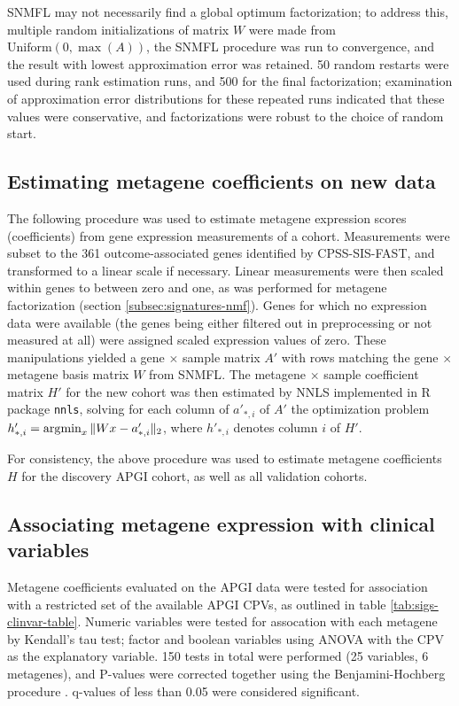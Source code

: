 \documentclass[dissertation.tex]{subfiles}
\begin{document}
\gls{SNMFL} may not necessarily find a global optimum factorization; to address this, multiple random initializations of matrix $W$ were made from $\text{Uniform}(0, \max(A))$, the \gls{SNMFL} procedure was run to convergence, and the result with lowest approximation error was retained.  50 random restarts were used during rank estimation runs, and 500 for the final factorization; examination of approximation error distributions for these repeated runs indicated that these values were conservative, and factorizations were robust to the choice of random start.

\subsection{Estimating metagene coefficients on new data}
\label{subsec:sigs-metagene-est}
The following procedure was used to estimate metagene expression scores (coefficients) from gene expression measurements of a cohort.  Measurements were subset to the 361 outcome-associated genes identified by \gls{CPSS}-\gls{SIS}-\gls{FAST}, and transformed to a linear scale if necessary.  Linear measurements were then scaled within genes to between zero and one, as was performed for metagene factorization (section \ref{subsec:signatures-nmf}).  Genes for which no expression data were available (the genes being either filtered out in preprocessing or not measured at all) were assigned scaled expression values of zero.  These manipulations yielded a gene $\times$ sample matrix $A'$ with rows matching the gene $\times$ metagene basis matrix $W$ from \gls{SNMFL}.  The metagene $\times$ sample coefficient matrix $H'$ for the new cohort was then estimated by \gls{NNLS} implemented in R package \texttt{nnls}, solving for each column of $a'_{*,i}$ of $A'$ the optimization problem ${h'_{*,i}} = \operatorname*{\arg\!\min}_x \| W x - a'_{*,i} \|_2$, where $h'_{*,i}$ denotes column $i$ of $H'$.

For consistency, the above procedure was used to estimate metagene coefficients $H$ for the discovery \gls{APGI} cohort, as well as all validation cohorts.

\subsection{Associating metagene expression with clinical variables}
Metagene coefficients evaluated on the \gls{APGI} data were tested for association with a restricted set of the available \gls{APGI} \glspl{CPV}, as outlined in table \ref{tab:sigs-clinvar-table}.  Numeric variables were tested for assocation with each metagene by Kendall's tau test; factor and boolean variables using ANOVA with the \gls{CPV} as the explanatory variable.  150 tests in total were performed (25 variables, 6 metagenes), and P-values were corrected together using the Benjamini-Hochberg procedure \cite{Benjamini1995}.  q-values of less than 0.05 were considered significant.
\end{document}
